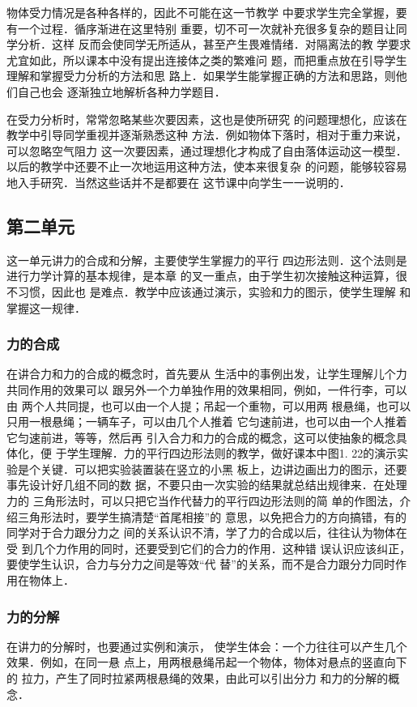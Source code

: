 物体受力情况是各种各样的，因此不可能在这一节教学
中要求学生完全掌握，要有一个过程．循序渐进在这里特别
重要，切不可一次就补充很多复杂的题目让同学分析．这样
反而会使同学无所适从，甚至产生畏难情绪．对隔离法的教
学要求尤宜如此，所以课本中没有提出连接体之类的繁难问
题，而把重点放在引导学生理解和掌握受力分析的方法和思
路上．如果学生能掌握正确的方法和思路，则他们自己也会
逐渐独立地解析各种力学题目．

在受力分析时，常常忽略某些次要因素，这也是使所研究
的问题理想化，应该在教学中引导同学重视并逐渐熟悉这种
方法．例如物体下落时，相对于重力来说，可以忽略空气阻力
这一次要因素，通过理想化才构成了自由落体运动这一模型．
以后的教学中还要不止一次地运用这种方法，使本来很复杂
的问题，能够较容易地入手研究．当然这些话并不是都要在
这节课中向学生一一说明的．

\subsection{第二单元}
这一单元讲力的合成和分解，主要使学生掌握力的平行
四边形法则．这个法则是进行力学计算的基本规律，是本章
的叉一重点，由于学生初次接触这种运算，很不习惯，因此也
是难点．教学中应该通过演示，实验和力的图示，使学生理解
和掌握这一规律．

\subsubsection{力的合成}
在讲合力和力的合成的概念时，首先要从
生活中的事例出发，让学生理解儿个力共同作用的效果可以
跟另外一个力单独作用的效果相同，例如，一件行李，可以由
两个人共同提，也可以由一个人提；吊起一个重物，可以用两
根悬绳，也可以只用一根悬绳；一辆车子，可以由几个人推着
它匀速前进，也可以由一个人推着它匀速前进，等等，然后再
引入合力和力的合成的概念，这可以使抽象的概念具体化，便
于学生理解．力的平行四边形法则的教学，做好课本中图1.
22的演示实验是个关键．可以把实验装置装在竖立的小黑
板上，边讲边画出力的图示，还要事先设计好几组不同的数
据，不要只由一次实验的结果就总结出规律来．在处理力的
三角形法时，可以只把它当作代替力的平行四边形法则的简
单的作图法，介绍三角形法时，要学生搞清楚“首尾相接”的
意思，以免把合力的方向搞错，有的同学对于合力跟分力之
间的关系认识不清，学了力的合成以后，往往认为物体在受
到几个力作用的同时，还要受到它们的合力的作用．这种错
误认识应该纠正，要使学生认识，合力与分力之间是等效“代
替”的关系，而不是合力跟分力同时作用在物体上．

\subsubsection{力的分解}   在讲力的分解时，也要通过实例和演示，
使学生体会：一个力往往可以产生几个效果．例如，在同一悬
点上，用两根悬绳吊起一个物体，物体对悬点的竖直向下的
拉力，产生了同时拉紧两根悬绳的效果，由此可以引出分力
和力的分解的概念．

